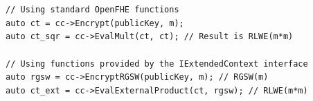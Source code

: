 \begin{example} 
\begin{verbatim}


// Using standard OpenFHE functions 
auto ct = cc->Encrypt(publicKey, m);
auto ct_sqr = cc->EvalMult(ct, ct); // Result is RLWE(m*m)

// Using functions provided by the IExtendedContext interface
auto rgsw = cc->EncryptRGSW(publicKey, m); // RGSW(m)
auto ct_ext = cc->EvalExternalProduct(ct, rgsw); // RLWE(m*m)
\end{verbatim}
\end{example}
